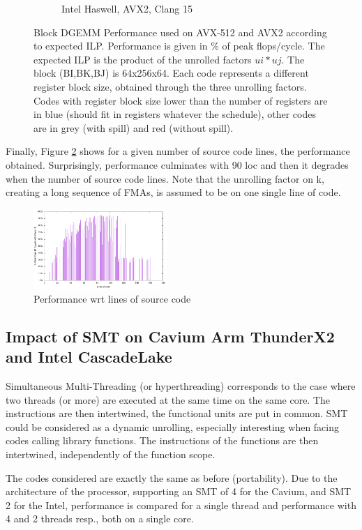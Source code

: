 \documentclass{article}
\begin{document}
\begin{figure}[h!]
\begin{subfigure}{0.45\textwidth}
  \caption{Intel Haswell, AVX2, Clang 15}
  \end{subfigure}
  \caption{Block DGEMM Performance used on AVX-512 and AVX2 according to expected ILP. Performance is given in \% of peak flops/cycle. The expected ILP is the product of the unrolled factors $ui * uj$. The block (BI,BK,BJ) is 64x256x64. Each code represents a different register block size, obtained through the three unrolling factors. Codes with register block size lower than the number of registers are in blue (should fit in registers whatever the schedule), other codes are in grey (with spill) and red (without spill).\label{fig:cascadelakeilp}}
\end{figure}

Finally, Figure \ref{fig:cascadelakeloc} shows for a given number of
source code lines, the performance obtained. Surprisingly, performance
culminates with 90 loc and then it degrades when the number of source
code lines. Note that the unrolling factor on k, creating a long
sequence of FMAs, is assumed to be on one single line of code.
\begin{figure}[h!]
  \includegraphics[width=0.45\textwidth]{../benches/gemm/cascadelake-64x256x64/icc21loc.pdf}
  \caption{Performance wrt lines of source code\label{fig:cascadelakeloc}}
\end{figure}


\subsection{Impact of SMT on Cavium Arm ThunderX2 and Intel CascadeLake}
Simultaneous Multi-Threading (or hyperthreading) corresponds to the case where two threads (or more) are executed at the same time on the same core. The instructions are then intertwined, the functional units are put in common. SMT could be considered as a dynamic unrolling, especially interesting when facing codes calling library functions. The instructions of the functions are then intertwined, independently of the function scope.   

The codes considered are exactly the same as before (portability).  Due to the architecture of the processor, supporting an SMT of 4 for the Cavium, and SMT 2 for the Intel,  performance is compared for a single thread and performance with 4 and 2  threads resp., both on a single core. 
\end{document}
